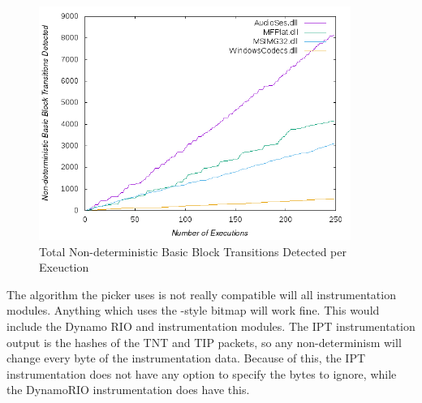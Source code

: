 
\begin{figure}[htb]
\centering
\includegraphics[width=4in]{picker.png}
\caption{Total Non-deterministic Basic Block Transitions Detected per Exeuction}
\label{fig:picker}
\end{figure}

The algorithm the picker uses is not really compatible will all instrumentation
modules. Anything which uses the \AFL{}-style bitmap will work fine.  This
would include the Dynamo RIO and \AFL{} instrumentation modules. The IPT
instrumentation output is the hashes of the TNT and TIP packets, so any
non-determinism will change every byte of the instrumentation data.  Because of
this, the IPT instrumentation does not have any option to specify the bytes to
ignore, while the DynamoRIO instrumentation does have this.
